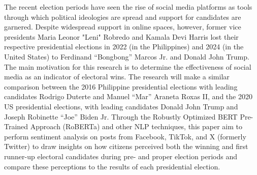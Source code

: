 \begin{thesisabstract}
The recent election periods have seen the rise of social media platforms as tools through which political ideologies are spread and support for candidates are garnered. Despite widespread support in online spaces, however, former vice presidents Maria Leonor "Leni" Robredo and Kamala Devi Harris lost their respective presidential elections in 2022 (in the Philippines) and 2024 (in the United States) to Ferdinand “Bongbong” Marcos Jr. and Donald John Trump. The main motivation for this research is to determine the effectiveness of social media as an indicator of electoral wins. The research will make a similar comparison between the 2016 Philippine presidential elections with leading candidates Rodrigo Duterte and Manuel “Mar” Araneta Roxas II, and the 2020 US presidential elections, with leading candidates Donald John Trump and Joseph Robinette “Joe” Biden Jr. Through the Robustly Optimized BERT Pre-Trained Approach (RoBERTa) and other NLP techniques, this paper aim to perform sentiment analysis on posts from Facebook, TikTok, and X (formerly Twitter) to draw insights on how citizens perceived both the winning and first runner-up electoral candidates during pre- and proper election periods and compare these perceptions to the results of each presidential election.
\end{thesisabstract}